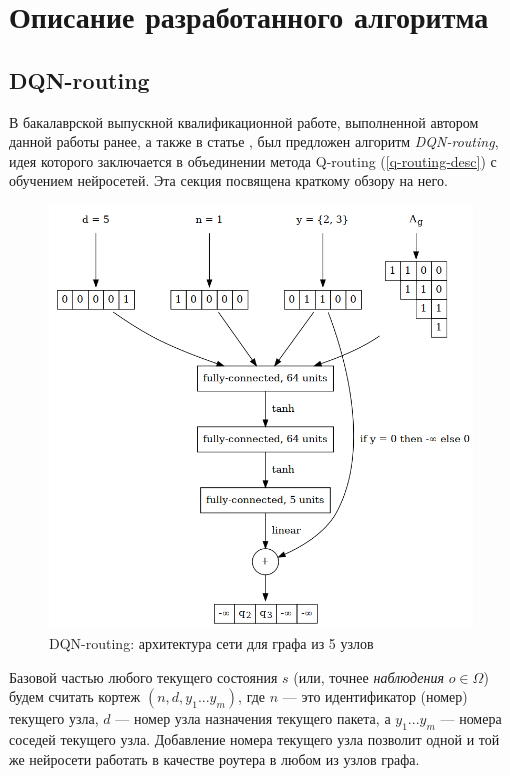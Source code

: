 \documentclass[specification,annotation,times]{itmo-student-thesis}
\theoremstyle{definition}
\begin{document}
\finishrelatedwork

\chapter{Описание разработанного алгоритма}

\section{DQN-routing}

В бакалаврской выпускной квалификационной работе, выполненной автором данной
работы ранее, а также в статье \cite{mukhutdinov2019multi}, был предложен
алгоритм \textit{DQN-routing}, идея которого заключается в объединении метода
Q-routing (\ref{q-routing-desc}) с обучением нейросетей. Эта секция посвящена
краткому обзору на него.

\begin{figure}[!h]
  \caption{DQN-routing: архитектура сети для графа из 5 узлов}\label{nn-pic-2}
  \centering
  \includegraphics[scale=0.5]{nn-2}
\end{figure}

Базовой частью любого текущего состояния $s$ (или, точнее \textit{наблюдения}
$o \in \Omega$) будем считать кортеж $(n, d, y_1 ... y_m)$, где $n$ --- это
идентификатор (номер) текущего узла, $d$ --- номер узла назначения текущего
пакета, а $y_1 ... y_m$ --- номера соседей текущего узла. Добавление номера
текущего узла позволит одной и той же нейросети работать в качестве роутера в
любом из узлов графа.
\end{document}
